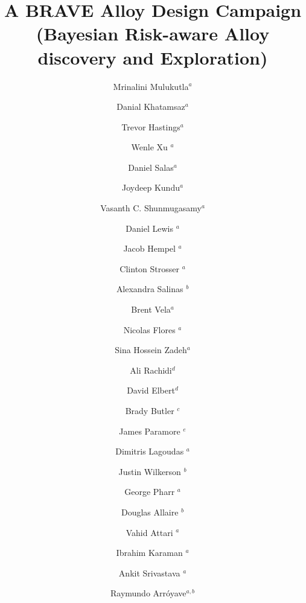 \documentclass[final,5p,times,twocolumn]{elsarticle}
\begin{document}
\begin{frontmatter}
\title{\Large{A BRAVE Alloy Design Campaign\\
(Bayesian Risk-aware Alloy discovery and Exploration)}}




\author{Mrinalini Mulukutla$^{a}$} 
\author{Danial Khatamsaz$^{a}$}
\author{Trevor Hastings$^{a}$}
\author{Wenle Xu $^{a}$}
\author{Daniel Salas$^{a}$}
\author{Joydeep Kundu$^{a}$}
\author{Vasanth C. Shunmugasamy$^{a}$}
\author{Daniel Lewis $^{a}$}
\author{Jacob Hempel $^{a}$}
\author{Clinton Strosser $^{a}$}
\author{Alexandra Salinas $^{b}$}
\author{Brent Vela$^{a}$}
\author{Nicolas Flores $^{a}$}
\author{Sina Hossein Zadeh$^{a}$}
\author{Ali Rachidi$^{d}$}
\author{David Elbert$^{d}$}
\author{Brady Butler $^{c}$}
\author{James Paramore $^{e}$}
\author{Dimitris Lagoudas $^{a}$}
\author{Justin Wilkerson $^{b}$}
\author{George Pharr $^{a}$}
\author{Douglas Allaire $^{b}$}
\author{Vahid Attari $^{a}$}
\author{Ibrahim Karaman $^{a}$}
\author{Ankit Srivastava $^{a}$}
\author{Raymundo Arr\'{o}yave$^{a,b}$}


\address{$^a$Department of Materials Science and Engineering, Texas A\&M University, College Station, TX 77843, USA}
\address{$^b$Mechanical Engineering Department, Texas A\&M University, College Station, TX, USA 77840}
\address{$^c$DEVCOM Army Research Laboratory South at Texas A\&M University, College Station, TX 77843-3003, USA}
\address{$^d$Hopkins Extreme Materials Institute, Johns Hopkins University, Baltimore, Maryland, 21218, USA}
\address{$^e$Bush Combat Development Complex, Texas A\&M University System, 3479 TAMU, College Station, TX 77843-3479, USA}



\end{frontmatter}
\end{document}
